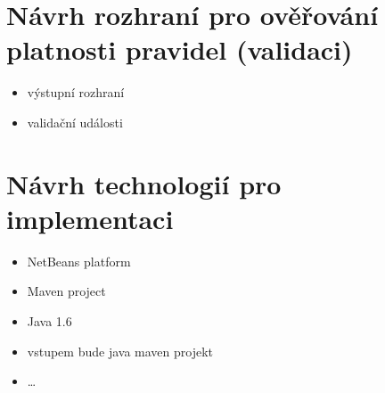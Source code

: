 \section{Návrh rozhraní pro ověřování platnosti pravidel (validaci)}
\begin{itemize}
\item výstupní rozhraní
\item validační události
\end{itemize}

\section{Návrh technologií pro implementaci}
\begin{itemize}
\item NetBeans platform
\item Maven project
\item Java 1.6
\item vstupem bude java maven projekt
\item \ldots
\end{itemize}
